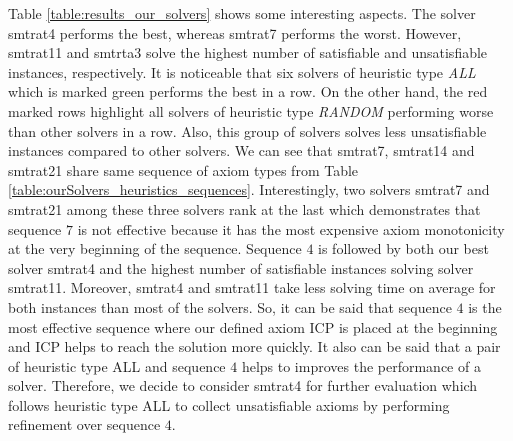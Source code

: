 \noindent Table \ref{table:results_our_solvers} shows some interesting aspects.
The solver smtrat4 performs the best, whereas smtrat7 performs the worst.
However, smtrat11 and smtrta3 solve the highest number of satisfiable and unsatisfiable instances, respectively.
It is noticeable that six solvers of heuristic type \textit{ALL} which is marked green performs the best in a row.
On the other hand, the red marked rows highlight all solvers of heuristic type \textit{RANDOM} performing worse than other solvers in a row.
Also, this group of solvers solves less unsatisfiable instances compared to other solvers.
We can see that smtrat7, smtrat14 and smtrat21 share same sequence of axiom types from Table \ref{table:ourSolvers_heuristics_sequences}.
Interestingly, two solvers smtrat7 and smtrat21 among these three solvers rank at the last which demonstrates that sequence $7$ is not effective because it has the most  expensive axiom monotonicity at the very beginning of the sequence.
Sequence $4$ is followed by both our best solver smtrat4 and the highest number of satisfiable instances solving solver smtrat11.
Moreover, smtrat4 and smtrat11 take less solving time on average for both instances than most of the solvers.
So, it can be said that sequence $4$ is the most effective sequence where our defined axiom ICP is placed at the beginning and ICP helps to reach the solution more quickly.
It also can be said that a pair of heuristic type ALL and sequence $4$ helps to improves the performance of a solver.
Therefore, we decide to consider smtrat4  for further evaluation which follows heuristic type ALL to collect unsatisfiable axioms by performing refinement over sequence $4$.\newline

